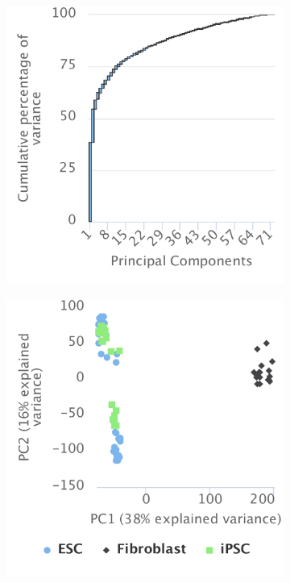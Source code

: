 \begin{figure}[!h]
	\centering
	\begin{subfigure}[h]{0.32\textwidth}
		\includegraphics[width=\textwidth]{images/psichomics/5-pca/a}
	\end{subfigure}
	\begin{subfigure}[h]{0.32\textwidth}
		\includegraphics[width=\textwidth]{images/psichomics/5-pca/b}

\end{subfigure}
\end{figure}
